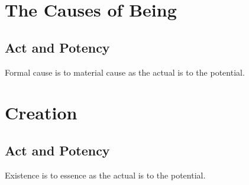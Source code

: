 \documentclass[twocolumn]{article}
\begin{document}
\section{The Causes of Being}

\subsection{Act and Potency}

Formal cause is to material cause as the actual is to the potential.

\section{Creation}

\subsection{Act and Potency}

Existence is to essence as the actual is to the potential.


\end{document}
